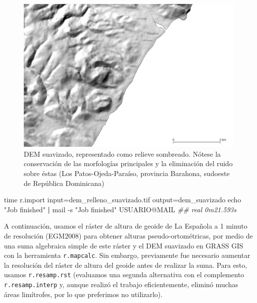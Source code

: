 \documentclass[spanish]{article}
\newenvironment{Shaded}{\begin{snugshade}}{\end{snugshade}}
\newcommand{\AttributeTok}[1]{\textcolor[rgb]{0.77,0.63,0.00}{#1}}
\newcommand{\BuiltInTok}[1]{#1}
\newcommand{\CommentTok}[1]{\textcolor[rgb]{0.56,0.35,0.01}{\textit{#1}}}
\newcommand{\ExtensionTok}[1]{#1}
\newcommand{\KeywordTok}[1]{\textcolor[rgb]{0.13,0.29,0.53}{\textbf{#1}}}
\newcommand{\NormalTok}[1]{#1}
\newcommand{\StringTok}[1]{\textcolor[rgb]{0.31,0.60,0.02}{#1}}
\begin{document}
\begin{figure}

{\centering \includegraphics[width=0.8\linewidth]{figuras/dem-suavizado} 

}

\caption{DEM suavizado, representado como relieve sombreado. Nótese la conservación de las morfologías principales y la eliminación del ruido sobre éstas (Los Patos-Ojeda-Paraíso, provincia Barahona, sudoeste de República Dominicana)}\label{fig:demsuavizado}
\end{figure}

\begin{Shaded}
\begin{Highlighting}[]
\BuiltInTok{time}\NormalTok{ r.import input=dem\_relleno\_suavizado.tif output=dem\_suavizado}
\BuiltInTok{echo} \StringTok{"Job finished"} \KeywordTok{|} \ExtensionTok{mail} \AttributeTok{{-}s} \StringTok{"Job finished"}\NormalTok{ USUARIO@MAIL}
\CommentTok{\#\# real 0m21.593s}
\end{Highlighting}
\end{Shaded}

A continuación, usamos el ráster de altura de geoide de La Española a 1
minuto de resolución (EGM2008) para obtener alturas pseudo-ortométricas,
por medio de una suma algebraica simple de este ráster y el DEM
suavizado en GRASS GIS con la herramienta \texttt{r.mapcalc}. Sin
embargo, previamente fue necesario aumentar la resolución del ráster de
altura del geoide antes de realizar la suma. Para esto, usamos
\texttt{r.resamp.rst} (evaluamos una segunda alternativa con el
complemento \texttt{r.resamp.interp} y, aunque realizó el trabajo
eficientemente, eliminó muchas áreas limítrofes, por lo que preferimos
no utilizarlo).
\end{document}
